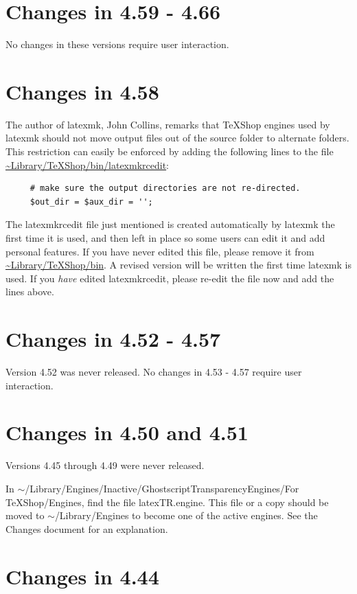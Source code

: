 \documentclass[11pt, oneside]{amsart}
\begin{document}
\section{Changes in 4.59 - 4.66}

No changes in these versions require user interaction.  

\section{Changes in 4.58}

The author of latexmk, John Collins, remarks that TeXShop engines used by latexmk should not move output files out of the source folder to alternate folders. This restriction can easily be enforced by adding the following lines to the file \url{~Library/TeXShop/bin/latexmkrcedit}:
\begin{verbatim}
     # make sure the output directories are not re-directed.
     $out_dir = $aux_dir = '';
\end{verbatim}

The latexmkrcedit file just mentioned is created automatically by latexmk the first time it is used, and then left in place so some users can edit it and add personal features. If you have never edited this file, please remove it from
\url{~Library/TeXShop/bin}. A revised version will be written the first time latexmk is used. If you {\em have} edited latexmkrcedit, please re-edit the file now and add the lines above.

\section{Changes in 4.52 - 4.57}

Version 4.52 was never released. No changes in 4.53 - 4.57 require user interaction.  


\section{Changes in 4.50 and 4.51}

Versions 4.45 through 4.49 were never released. 

In  $\sim$/Library/Engines/Inactive/GhostscriptTransparencyEngines/For TeXShop/Engines, find the file  latexTR.engine. This file or a copy should be moved to $\sim$/Library/Engines to become one of the active engines. See the Changes document for an explanation.

\section{Changes in 4.44}
\end{document}

